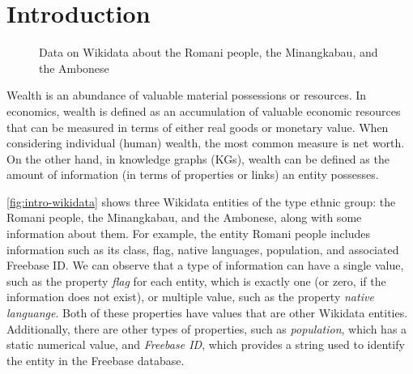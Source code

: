 \section{Introduction}






\begin{figure}[!htbp]
    \centering
    \caption{Data on Wikidata about the Romani people, the Minangkabau, and the Ambonese} \label{fig:intro-wikidata}
\end{figure}

Wealth is an abundance of valuable material possessions or resources. In economics, wealth is defined as an accumulation of valuable economic resources that can be measured in terms of either real goods or monetary value. When considering individual (human) wealth, the most common measure is net worth. On the other hand, in knowledge graphs (KGs), wealth can be defined as the amount of information (in terms of properties or links) an entity possesses.

\autoref{fig:intro-wikidata} shows three Wikidata entities of the type ethnic group: the Romani people, the Minangkabau, and the Ambonese, along with some information about them. For example, the entity Romani people includes information such as its class, flag, native languages, population, and associated Freebase ID. We can observe that a type of information can have a single value, such as the property \textit{flag} for each entity, which is exactly one (or zero, if the information does not exist), or multiple value, such as the property \textit{native languange}. Both of these properties have values that are other Wikidata entities. Additionally, there are other types of properties, such as \textit{population}, which has a static numerical value, and \textit{Freebase ID}, which provides a string used to identify the entity in the Freebase database.

